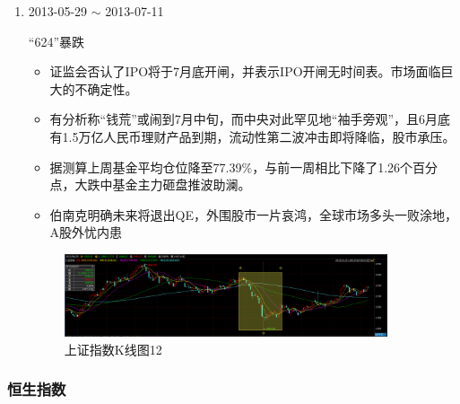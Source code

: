 \documentclass[12pt,a4paper]{article}
\begin{document}
\begin{enumerate}[1)]
\item 2013-05-29 $\sim$ 2013-07-11 
	
	“624”暴跌
		
	\begin{itemize}
		\item  证监会否认了IPO将于7月底开闸，并表示IPO开闸无时间表。市场面临巨大的不确定性。\item 有分析称“钱荒”或闹到7月中旬，而中央对此罕见地“袖手旁观”，且6月底有1.5万亿人民币理财产品到期，流动性第二波冲击即将降临，股市承压。
		\item 据测算上周基金平均仓位降至77.39\%，与前一周相比下降了1.26个百分点，大跌中基金主力砸盘推波助澜。
		\item 伯南克明确未来将退出QE，外围股市一片哀鸿，全球市场多头一败涂地，A股外忧内患
	
	\end{itemize}
	\begin{figure}[H]
		\centering
		\includegraphics[width=0.9\textwidth]{img/22.png}%
		\caption{上证指数K线图12}
	\end{figure}	
	
\end{enumerate}

\subsubsection{恒生指数}
\end{document}
